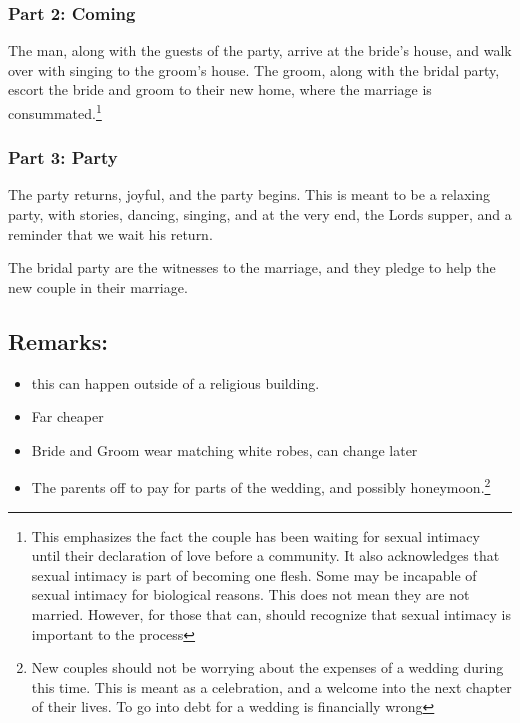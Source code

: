 \documentclass[CSHFoundation.tex]{subfiles}
\begin{document}
\subsubsection{Part 2: Coming}

The man, along with the guests of the party, arrive at the bride's house, and walk over with singing to the groom's house. The groom, along with the bridal party, escort the bride and groom to their new home, where the marriage is consummated.\footnote{This emphasizes the fact the couple has been waiting for sexual intimacy until their declaration of love before a community. It also acknowledges that sexual intimacy is part of becoming one flesh. Some may be incapable of sexual intimacy for biological reasons. This does not mean they are not married. However, for those that can, should recognize that sexual intimacy is important to the process}



\subsubsection{Part 3: Party}

The party returns, joyful, and the party begins. This is meant to be a relaxing party, with stories, dancing, singing, and at the very end, the Lords supper, and a reminder that we wait his return.


The bridal party are the witnesses to the marriage, and they pledge to help the new couple in their marriage.



\subsection{Remarks:}

\begin{itemize}
\item this can happen outside of a religious building.
\item Far cheaper
\item Bride and Groom wear matching white robes, can change later
\item The parents off to pay for parts of the wedding, and possibly  honeymoon.\footnote{New couples should not be worrying about the expenses of a wedding during this time. This is meant as a celebration, and a welcome into the next chapter of their lives. To go into debt for a wedding is financially wrong}
\end{itemize}
\end{document}
